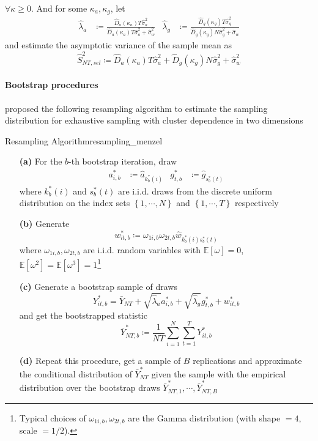 \documentclass[twoside]{article}
\begin{document}
$\forall \kappa \geq 0$. And for some $\kappa_a,\kappa_g$, let 
\begin{align*}
    \hat{\lambda}_a & \coloneq \frac{\hat{D}_a (\kappa_a)T\hat{\sigma}^2_a}{\hat{D}_a (\kappa_a)T\hat{\sigma}^2_a+\hat{\sigma}_w^2} & \hat{\lambda}_g & \coloneq \frac{\hat{D}_g (\kappa_g)T\hat{\sigma}^2_g}{\hat{D}_g (\kappa_g)N\hat{\sigma}^2_g + \hat{\sigma}_w}
\end{align*}
and estimate the asymptotic variance of the sample mean as 
\begin{equation}\label{eq:asymp_variance}
    \hat{S}^2_{NT,sel}\coloneq \hat{D}_a(\kappa_a)T\hat{\sigma}^2_a + \hat{D}_g (\kappa_g) N\hat{\sigma}^2_g + \hat{\sigma}^2_w
\end{equation}

\paragraph*{Bootstrap procedures}
\citet{menzel2021bootstrap} proposed the following resampling algorithm to estimate the sampling distribution for exhaustive sampling with cluster dependence in two dimensions 
\begin{algorithm}{Resampling Algorithm}{resampling_menzel}
    \begin{itemize}
        \item[\textbf{(a)}] For the $b$-th bootstrap iteration, draw 
        \begin{align*}
            a^*_{i,b} &\coloneq \hat{a}_{k^*_b(i)} & g^*_{t,b} &\coloneq \hat{g}_{s^*_b(t)}
        \end{align*}
        where $k^*_b(i)$ and $s^*_b(t)$ are i.i.d. draws from the discrete uniform distribution on the index sets $\left\{1,\cdots,N\right\}$ and $\left\{1,\cdots,T\right\}$ respectively
        \item[\textbf{(b)}] Generate $$ w^*_{it,b} \coloneq \omega_{1i,b}\omega_{2t,b}\hat{w}_{k^*_b(i)s^*_b(t)} $$ where $\omega_{1i,b},\omega_{2t,b}$ are i.i.d. random variables with $\mathbb{E}\left[\omega\right]=0$, $\mathbb{E}\left[\omega^2\right] = \mathbb{E}\left[\omega^3\right] = 1$\footnote{Typical choices of $\omega_{1i,b},\omega_{2t,b}$ are the Gamma distribution (with shape $=4$, scale $=1/2$).}
        \item[\textbf{(c)}] Generate a bootstrap sample of draws $$ Y^*_{it,b} = \bar{Y}_{NT} + \sqrt{\hat{\lambda}_a}a^*_{i,b} + \sqrt{\hat{\lambda}_g}g^*_{t,b} + w^*_{it,b} $$ and get the bootstrapped statistic $$ \bar{Y}^*_{NT,b} \coloneq \frac{1}{NT} \sum^N_{i=1}\sum^T_{t=1}Y^*_{it,b} $$ 
        \item[\textbf{(d)}] Repeat this procedure, get a sample of $B$ replications and approximate the conditional distribution of $\bar{Y}^*_{NT}$ given the sample with the empirical distribution over the bootstrap draws $\bar{Y}^*_{NT,1},\cdots,\bar{Y}^*_{NT,B}$ 
    \end{itemize}
\end{algorithm}
\end{document}

